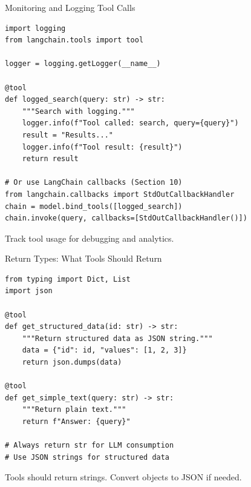 \documentclass[aspectratio=169,11pt]{beamer}
\begin{document}
\begin{frame}[fragile,shrink=2]{Monitoring and Logging Tool Calls}
\begin{codebox}
\begin{lstlisting}
import logging
from langchain.tools import tool

logger = logging.getLogger(__name__)

@tool
def logged_search(query: str) -> str:
    """Search with logging."""
    logger.info(f"Tool called: search, query={query}")
    result = "Results..."
    logger.info(f"Tool result: {result}")
    return result

# Or use LangChain callbacks (Section 10)
from langchain.callbacks import StdOutCallbackHandler
chain = model.bind_tools([logged_search])
chain.invoke(query, callbacks=[StdOutCallbackHandler()])
\end{lstlisting}
\end{codebox}

Track tool usage for debugging and analytics.
\end{frame}

\begin{frame}[fragile,shrink=2]{Return Types: What Tools Should Return}
\begin{codebox}
\begin{lstlisting}
from typing import Dict, List
import json

@tool
def get_structured_data(id: str) -> str:
    """Return structured data as JSON string."""
    data = {"id": id, "values": [1, 2, 3]}
    return json.dumps(data)

@tool
def get_simple_text(query: str) -> str:
    """Return plain text."""
    return f"Answer: {query}"

# Always return str for LLM consumption
# Use JSON strings for structured data
\end{lstlisting}
\end{codebox}

\begin{tipbox}
Tools should return strings. Convert objects to JSON if needed.
\end{tipbox}
\end{frame}
\end{document}

